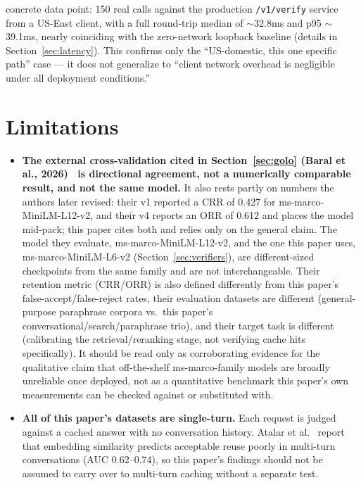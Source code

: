 \documentclass[11pt]{article}
\begin{document}
concrete data point: 150 real calls against the production \texttt{/\allowbreak{}v1/\allowbreak{}verify} service from a US-East client, with a full round-trip median of $\sim$32.8ms and p95 $\sim$39.1ms, nearly coinciding with the zero-network loopback baseline (details in Section~\ref{sec:latency}). This confirms only the ``US-domestic, this one specific path'' case --- it does not generalize to ``client network overhead is negligible under all deployment conditions.''

\section{Limitations}
\label{sec:limitations}

\begin{itemize}[leftmargin=*]
  \item \textbf{The external cross-validation cited in Section~\ref{sec:golo} (Baral et al., 2026)~\cite{calibrationgap} is directional agreement, not a numerically comparable result, and not the same model.} It also rests partly on numbers the authors later revised: their v1 reported a CRR of 0.427 for ms-marco-MiniLM-L12-v2, and their v4 reports an ORR of 0.612 and places the model mid-pack; this paper cites both and relies only on the general claim. The model they evaluate, ms-marco-MiniLM-L12-v2, and the one this paper uses, ms-marco-MiniLM-L6-v2 (Section~\ref{sec:verifiers}), are different-sized checkpoints from the same family and are not interchangeable. Their retention metric (CRR/ORR) is also defined differently from this paper's false-accept/false-reject rates, their evaluation datasets are different (general-purpose paraphrase corpora vs.\ this paper's conversational/search/paraphrase trio), and their target task is different (calibrating the retrieval/reranking stage, not verifying cache hits specifically). It should be read only as corroborating evidence for the qualitative claim that off-the-shelf ms-marco-family models are broadly unreliable once deployed, not as a quantitative benchmark this paper's own measurements can be checked against or substituted with.
  \item \textbf{All of this paper's datasets are single-turn.} Each request is judged against a cached answer with no conversation history. Atalar et al.~\cite{atalar26} report that embedding similarity predicts acceptable reuse poorly in multi-turn conversations (AUC 0.62--0.74), so this paper's findings should not be assumed to carry over to multi-turn caching without a separate test.

\end{itemize}
\end{document}

